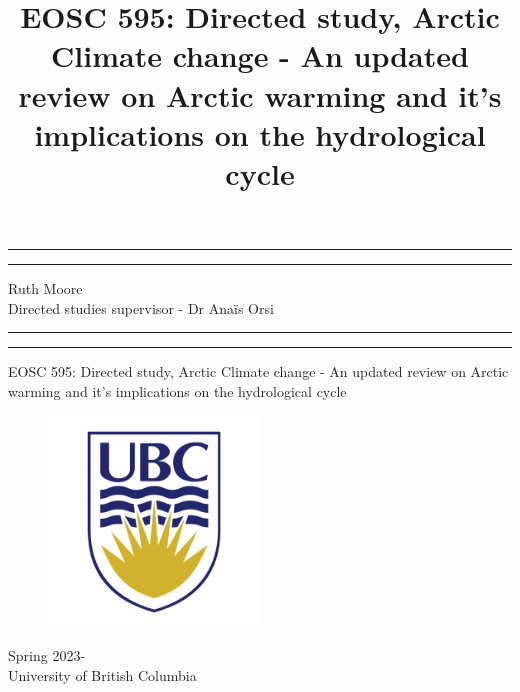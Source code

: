 \documentclass[11pt, oneside]{article}
\title{EOSC 595: Directed study, Arctic Climate change - An updated review on Arctic warming and it's implications on the hydrological cycle }
\begin{document}
\begin{titlepage}
	\centering 
	\scshape
	\vspace*{2\baselineskip}
	\rule{\textwidth}{1.6pt}\vspace*{-\baselineskip}\vspace*{2pt} 
	\rule{\textwidth}{0.4pt} 
	\vspace{0.1in}
		{\Large Ruth Moore } \\
		\vspace{0.1in}
		{\Large Directed studies supervisor - Dr Anaïs Orsi} \\
	\vspace{0.75\baselineskip} 
	\rule{\textwidth}{0.4pt}\vspace*{-\baselineskip}\vspace*{2pt} 
		\rule{\textwidth}{1.6pt}
	\vspace*{2\baselineskip} 

\Huge{EOSC 595: Directed study, Arctic Climate change - An updated review on Arctic warming and it's implications on the hydrological cycle}
\vspace{0.1in}	

\begin{figure}[hbtp]
\centering
\includegraphics[width=0.5\textwidth]{../ubc-logo-png-transparent.png}
\end{figure}
{\Large Spring 2023- } \\
	{\large University of British Columbia} 
\end{titlepage}
\pagestyle{fancy}
\tableofcontents
\thispagestyle{empty}
\clearpage
\setcounter{page}{1}


\pagebreak
\end{document}
